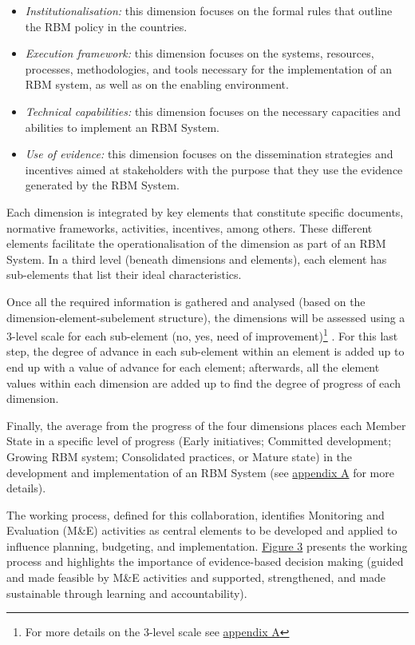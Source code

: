 \documentclass[
  10pt,
]{book}
\begin{document}
\begin{itemize}
\item
  \emph{Institutionalisation:} this dimension focuses on the formal rules that outline the RBM policy in the countries.
\item
  \emph{Execution framework:} this dimension focuses on the systems, resources, processes, methodologies, and tools necessary for the implementation of an RBM system, as well as on the enabling environment.
\item
  \emph{Technical capabilities:} this dimension focuses on the necessary capacities and abilities to implement an RBM System.
\item
  \emph{Use of evidence:} this dimension focuses on the dissemination strategies and incentives aimed at stakeholders with the purpose that they use the evidence generated by the RBM System.
\end{itemize}

Each dimension is integrated by key elements that constitute specific documents, normative frameworks, activities, incentives, among others. These different elements facilitate the operationalisation of the dimension as part of an RBM System. In a third level (beneath dimensions and elements), each element has sub-elements that list their ideal characteristics.

Once all the required information is gathered and analysed (based on the dimension-element-subelement structure), the dimensions will be assessed using a 3-level scale for each sub-element (no, yes, need of improvement)\footnote{For more details on the 3-level scale see \protect\hyperlink{appendixA}{appendix A}} . For this last step, the degree of advance in each sub-element within an element is added up to end up with a value of advance for each element; afterwards, all the element values within each dimension are added up to find the degree of progress of each dimension.

Finally, the average from the progress of the four dimensions places each Member State in a specific level of progress (Early initiatives; Committed development; Growing RBM system; Consolidated practices, or Mature state) in the development and implementation of an RBM System (see \protect\hyperlink{appendixA}{appendix A} for more details).

The working process, defined for this collaboration, identifies Monitoring and Evaluation (M\&E) activities as central elements to be developed and applied to influence planning, budgeting, and implementation. \protect\hyperlink{fig:figure3}{Figure 3} presents the working process and highlights the importance of evidence-based decision making (guided and made feasible by M\&E activities and supported, strengthened, and made sustainable through learning and accountability).
\end{document}
